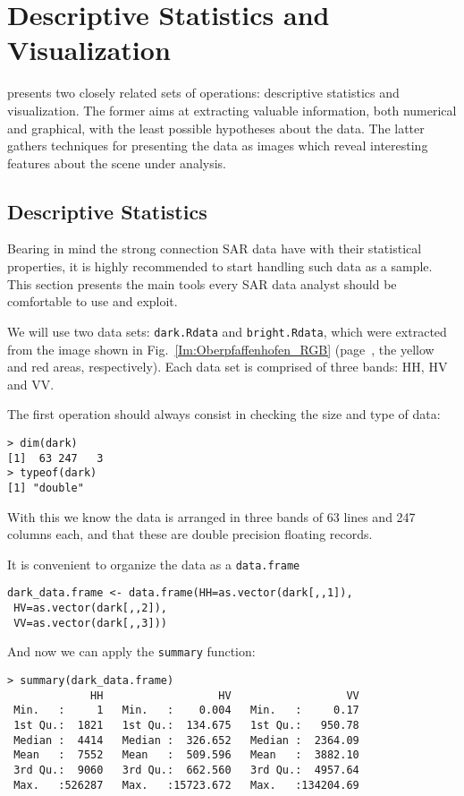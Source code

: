 \chapter{Descriptive Statistics and Visualization}\label{Chapter:DescriptiveVisualization}

 presents two closely related sets of operations:
descriptive statistics and visualization.
The former aims at extracting valuable information, both numerical and graphical, with the least possible hypotheses about the data.
The latter gathers techniques for presenting the data as images which reveal interesting features about the scene under analysis.

\section{Descriptive Statistics}

Bearing in mind the strong connection SAR data have with their statistical properties, it is highly recommended to start handling such data as a sample. This section presents the main tools every SAR data analyst should be comfortable to use and exploit.

We will use two data sets: \texttt{dark.Rdata} and \texttt{bright.Rdata}, which were extracted from the image shown in Fig.~\ref{Im:Oberpfaffenhofen_RGB} (page~\pageref{Im:Oberpfaffenhofen_RGB}, the yellow and red areas, respectively).
Each data set is comprised of three bands: HH, HV and VV.

The first operation should always consist in checking the size and type of data:
\begin{lstlisting}
> dim(dark)
[1]  63 247   3
> typeof(dark)
[1] "double"
\end{lstlisting}
With this we know the data is arranged in three bands of \num{63} lines and \num{247} columns each, and that these are double precision floating records.

It is convenient to organize the data as a \texttt{data.frame}
\begin{lstlisting}
dark_data.frame <- data.frame(HH=as.vector(dark[,,1]),
 HV=as.vector(dark[,,2]), 
 VV=as.vector(dark[,,3]))
\end{lstlisting}

And now we can apply the \texttt{summary} function:
\begin{lstlisting}[caption={Summary statistics},label=Code:SummaryStatistics]
> summary(dark_data.frame)
             HH                  HV                  VV
 Min.   :     1   Min.   :    0.004   Min.   :     0.17  
 1st Qu.:  1821   1st Qu.:  134.675   1st Qu.:   950.78  
 Median :  4414   Median :  326.652   Median :  2364.09  
 Mean   :  7552   Mean   :  509.596   Mean   :  3882.10  
 3rd Qu.:  9060   3rd Qu.:  662.560   3rd Qu.:  4957.64  
 Max.   :526287   Max.   :15723.672   Max.   :134204.69  
\end{lstlisting}

